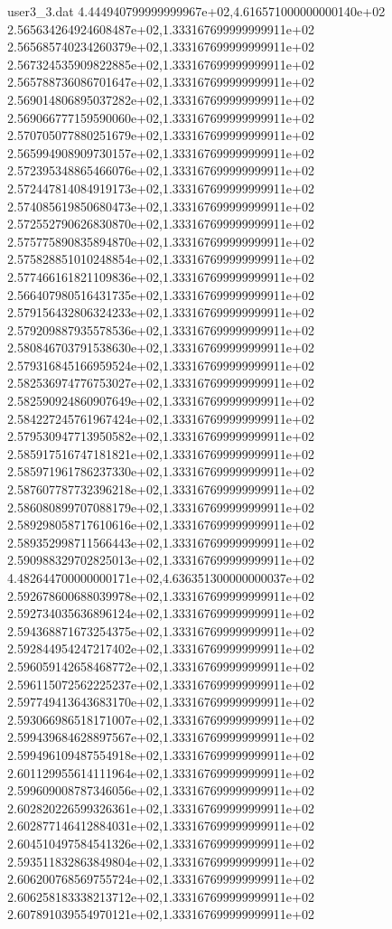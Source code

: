 \begin{filecontents}{user3_3.dat}
4.444940799999999967e+02,4.616571000000000140e+02
2.565634264924608487e+02,1.333167699999999911e+02
2.565685740234260379e+02,1.333167699999999911e+02
2.567324535909822885e+02,1.333167699999999911e+02
2.565788736086701647e+02,1.333167699999999911e+02
2.569014806895037282e+02,1.333167699999999911e+02
2.569066777159590060e+02,1.333167699999999911e+02
2.570705077880251679e+02,1.333167699999999911e+02
2.565994908909730157e+02,1.333167699999999911e+02
2.572395348865466076e+02,1.333167699999999911e+02
2.572447814084919173e+02,1.333167699999999911e+02
2.574085619850680473e+02,1.333167699999999911e+02
2.572552790626830870e+02,1.333167699999999911e+02
2.575775890835894870e+02,1.333167699999999911e+02
2.575828851010248854e+02,1.333167699999999911e+02
2.577466161821109836e+02,1.333167699999999911e+02
2.566407980516431735e+02,1.333167699999999911e+02
2.579156432806324233e+02,1.333167699999999911e+02
2.579209887935578536e+02,1.333167699999999911e+02
2.580846703791538630e+02,1.333167699999999911e+02
2.579316845166959524e+02,1.333167699999999911e+02
2.582536974776753027e+02,1.333167699999999911e+02
2.582590924860907649e+02,1.333167699999999911e+02
2.584227245761967424e+02,1.333167699999999911e+02
2.579530947713950582e+02,1.333167699999999911e+02
2.585917516747181821e+02,1.333167699999999911e+02
2.585971961786237330e+02,1.333167699999999911e+02
2.587607787732396218e+02,1.333167699999999911e+02
2.586080899707088179e+02,1.333167699999999911e+02
2.589298058717610616e+02,1.333167699999999911e+02
2.589352998711566443e+02,1.333167699999999911e+02
2.590988329702825013e+02,1.333167699999999911e+02
4.482644700000000171e+02,4.636351300000000037e+02
2.592678600688039978e+02,1.333167699999999911e+02
2.592734035636896124e+02,1.333167699999999911e+02
2.594368871673254375e+02,1.333167699999999911e+02
2.592844954247217402e+02,1.333167699999999911e+02
2.596059142658468772e+02,1.333167699999999911e+02
2.596115072562225237e+02,1.333167699999999911e+02
2.597749413643683170e+02,1.333167699999999911e+02
2.593066986518171007e+02,1.333167699999999911e+02
2.599439684628897567e+02,1.333167699999999911e+02
2.599496109487554918e+02,1.333167699999999911e+02
2.601129955614111964e+02,1.333167699999999911e+02
2.599609008787346056e+02,1.333167699999999911e+02
2.602820226599326361e+02,1.333167699999999911e+02
2.602877146412884031e+02,1.333167699999999911e+02
2.604510497584541326e+02,1.333167699999999911e+02
2.593511832863849804e+02,1.333167699999999911e+02
2.606200768569755724e+02,1.333167699999999911e+02
2.606258183338213712e+02,1.333167699999999911e+02
2.607891039554970121e+02,1.333167699999999911e+02

\end{filecontents}
